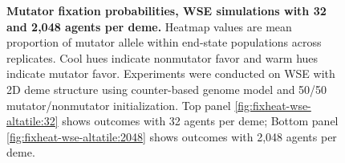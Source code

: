 \begin{figure}[h]
  \begin{minipage}{\linewidth}
    \caption{%
\textbf{Mutator fixation probabilities, WSE simulations with 32 and 2,048 agents per deme.}
\footnotesize
Heatmap values are mean proportion of mutator allele within end-state populations across replicates.
Cool hues indicate nonmutator favor and warm hues indicate mutator favor.
Experiments were conducted on WSE with 2D deme structure using counter-based genome model and 50/50 mutator/nonmutator initialization.
Top panel \ref{fig:fixheat-wse-altatile:32} shows outcomes with 32 agents per deme;
Bottom panel \ref{fig:fixheat-wse-altatile:2048} shows outcomes with 2,048 agents per deme.
    }
    \label{fig:fixheat-wse-altatile}
  \end{minipage}
\end{figure}
